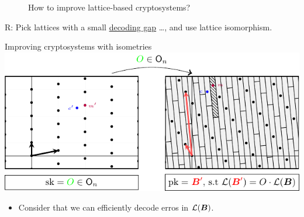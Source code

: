 \documentclass[10pt]{beamer}
\begin{document}
\begin{frame}
				\begin{figure}
								\Large How to improve lattice-based cryptosystems?
				\end{figure}

				\scriptsize R: Pick lattices with a small \underline{decoding gap} \dots, and use lattice isomorphism.
\end{frame}

\begin{frame}{Improving cryptosystems with isometries}
				\includegraphics{figures/orthogonal-transformation.pdf}


				\begin{itemize}
								\item Consider that we can efficiently decode erros in $\mathcal{L}(\boldsymbol{B})$.
				\end{itemize}
\end{frame}
\end{document}
